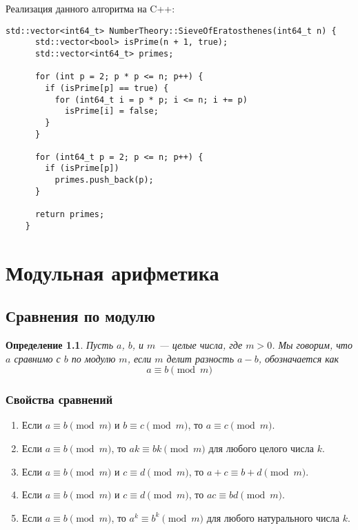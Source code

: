 \documentclass[12pt, a4paper, openany]{book}
\newtheorem*{definition}{Определение}
\begin{document}
\newpage
\noindent
    Реализация данного алгоритма на C++:

\begin{lstlisting}[breaklines=true]
    std::vector<int64_t> NumberTheory::SieveOfEratosthenes(int64_t n) {
      std::vector<bool> isPrime(n + 1, true);
      std::vector<int64_t> primes;
    
      for (int p = 2; p * p <= n; p++) {
        if (isPrime[p] == true) {
          for (int64_t i = p * p; i <= n; i += p)
            isPrime[i] = false;
        }
      }
    
      for (int64_t p = 2; p <= n; p++) {
        if (isPrime[p])
          primes.push_back(p);
      }
    
      return primes;
    }
\end{lstlisting}

\chapter[Модульная арифметика]{Модульная арифметика}
\section{Сравнения по модулю}

\begin{definition}
    Пусть $a$, $b$, и $m$ --- целые числа, где $m > 0$. Мы говорим, что $a$ сравнимо с $b$ по модулю $m$, если $m$ делит разность $a - b$, обозначается как \[a \equiv b \pmod{m}\]
\end{definition}

\subsection{Свойства сравнений}

\begin{enumerate}
    \item Если $a \equiv b \pmod{m}$ и $b \equiv c \pmod{m}$, то $a \equiv c \pmod{m}$.
    \item Если $a \equiv b \pmod{m}$, то $ak \equiv bk \pmod{m}$ для любого целого числа $k$.
    \item Если $a \equiv b \pmod{m}$ и $c \equiv d \pmod{m}$, то $a + c \equiv b + d \pmod{m}$.
    \item Если $a \equiv b \pmod{m}$ и $c \equiv d \pmod{m}$, то $ac \equiv bd \pmod{m}$.
    \item Если $a \equiv b \pmod{m}$, то $a^k \equiv b^k \pmod{m}$ для любого натурального числа $k$.
\end{enumerate}
\end{document}
